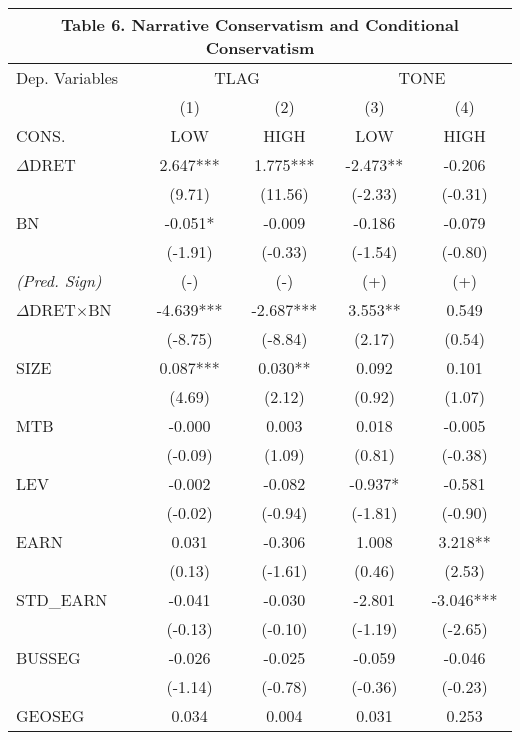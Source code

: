 \begin{table}[H] \label{T6}
	\begin{center}
		\tabcolsep=0.3cm
		\begin{tabular}{lcccc}
			\multicolumn{5}{c}{\textbf{Table 6. Narrative Conservatism and Conditional Conservatism}} \\
			\toprule
			\toprule
			Dep. Variables & \multicolumn{2}{c}{TLAG} & \multicolumn{2}{c}{TONE} \\
			\cmidrule{2-5}
			& (1) & (2) & (3) & (4) \\
			CONS. & LOW & HIGH & LOW & HIGH \\
			\midrule
			$\Delta$DRET & 2.647*** & 1.775*** & -2.473** & -0.206 \\
			& (9.71) & (11.56) & (-2.33) & (-0.31) \\
			BN & -0.051* & -0.009 & -0.186 & -0.079 \\
			& (-1.91) & (-0.33) & (-1.54) & (-0.80) \\
			\rowcolor[rgb]{ .906,  .902,  .902} \textit{(Pred. Sign)} & (-) & (-) & (+) & (+) \\
			\rowcolor[rgb]{ .906,  .902,  .902} $\Delta$DRET$\times$BN& -4.639*** & -2.687*** & 3.553** & 0.549 \\
			\rowcolor[rgb]{ .906,  .902,  .902} & (-8.75) & (-8.84) & (2.17) & (0.54) \\
			SIZE & 0.087*** & 0.030** & 0.092 & 0.101 \\
			& (4.69) & (2.12) & (0.92) & (1.07) \\
			MTB & -0.000 & 0.003 & 0.018 & -0.005 \\
			& (-0.09) & (1.09) & (0.81) & (-0.38) \\
			LEV & -0.002 & -0.082 & -0.937* & -0.581 \\
			& (-0.02) & (-0.94) & (-1.81) & (-0.90) \\
			EARN & 0.031 & -0.306 & 1.008 & 3.218** \\
			& (0.13) & (-1.61) & (0.46) & (2.53) \\
			STD\_EARN & -0.041 & -0.030 & -2.801 & -3.046*** \\
			& (-0.13) & (-0.10) & (-1.19) & (-2.65) \\
			BUSSEG & -0.026 & -0.025 & -0.059 & -0.046 \\
			& (-1.14) & (-0.78) & (-0.36) & (-0.23) \\
			GEOSEG & 0.034 & 0.004 & 0.031 & 0.253 \\

\end{tabular}
\end{center}
\end{table}
